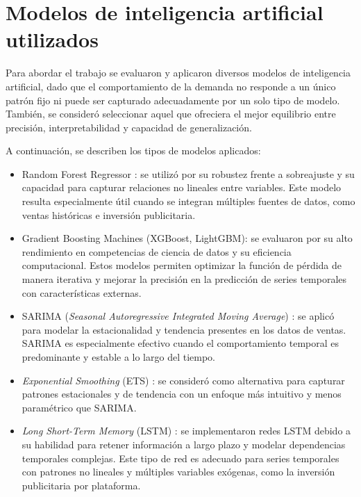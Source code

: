 \section{Modelos de inteligencia artificial utilizados}
\label{sec:modelo-ia}

Para abordar el trabajo se evaluaron y aplicaron diversos modelos de inteligencia artificial, dado que el comportamiento de la demanda no responde a un único patrón fijo ni puede ser capturado adecuadamente por un solo tipo de modelo. También, se consideró seleccionar aquel que ofreciera el mejor equilibrio entre precisión, interpretabilidad y capacidad de generalización.

A continuación, se describen los tipos de modelos aplicados:

	\begin{itemize}
		\item Random Forest Regressor \citep{randomforestregressor}: se utilizó por su robustez frente a sobreajuste y su capacidad para capturar relaciones no lineales entre variables. Este modelo resulta especialmente útil cuando se integran múltiples fuentes de datos, como ventas históricas e inversión publicitaria.

		\item Gradient Boosting Machines \cite{friedman2001gbm} (XGBoost, LightGBM): se evaluaron por su alto rendimiento en competencias de ciencia de datos y su eficiencia computacional. Estos modelos permiten optimizar la función de pérdida de manera iterativa y mejorar la precisión en la predicción de series temporales con características externas.

	\item SARIMA (\textit{Seasonal Autoregressive Integrated Moving Average}) \citep{boxjenkins1970}: se aplicó para modelar la estacionalidad y tendencia presentes en los datos de ventas. SARIMA es especialmente efectivo cuando el comportamiento temporal es predominante y estable a lo largo del tiempo.

	\item \textit{Exponential Smoothing} (ETS) \citep{hyndman2008forecasting}: se consideró como alternativa para capturar patrones estacionales y de tendencia con un enfoque más intuitivo y menos paramétrico que SARIMA.

	\item \textit{Long Short-Term Memory} (LSTM) \citep{LSTM}: se implementaron redes LSTM debido a su habilidad para retener información a largo plazo y modelar dependencias temporales complejas. Este tipo de red es adecuado para series temporales con patrones no lineales y múltiples variables exógenas, como la inversión publicitaria por plataforma.


\end{itemize}
